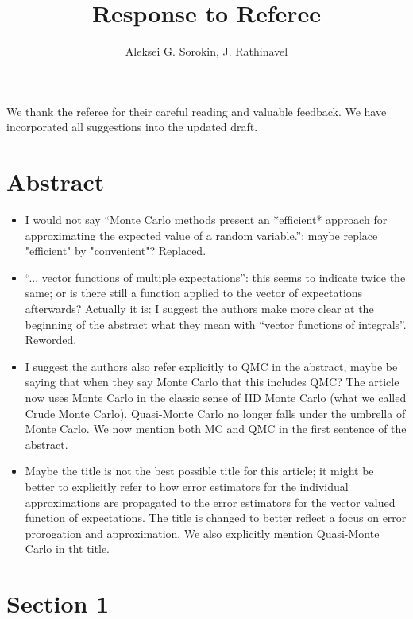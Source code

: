 \documentclass{article}[12pt]
\title{Response to Referee}
\author{Aleksei G. Sorokin, J. Rathinavel}
\date{}
\newcommand{\Referee}[1]{{\color{blue} #1 \newline}}
\begin{document}
\maketitle

We thank the referee for their careful reading and valuable feedback. We have incorporated all suggestions into the updated draft. 

\section*{Abstract}

\begin{itemize}
    \item \Referee{I would not say ``Monte Carlo methods present an *efficient* approach for approximating the expected value of a random variable.''; maybe replace "efficient" by "convenient"?}Replaced.
    \item \Referee{``... vector functions of multiple expectations'': this seems to indicate twice the same; or is there still a function applied to the vector of expectations afterwards? Actually it is: I suggest the authors make more clear at the beginning of the abstract what they mean with ``vector functions of integrals''.}Reworded.
    \item \Referee{I suggest the authors also refer explicitly to QMC in the abstract, maybe be saying that when they say Monte Carlo that this includes QMC?}The article  now uses Monte Carlo in the classic sense of IID Monte Carlo (what we called Crude Monte Carlo). Quasi-Monte Carlo no longer falls under the umbrella of Monte Carlo.  We now mention both MC and QMC in the first sentence of the abstract. 
    \item \Referee{Maybe the title is not the best possible title for this article; it might be better to explicitly refer to how error estimators for the individual approximations are propagated to the error estimators for the vector valued function of expectations.}The title is changed to better reflect a focus on error prorogation and approximation. We also explicitly mention Quasi-Monte Carlo in tht title. 
\end{itemize}

\section*{Section 1}
\end{document}
